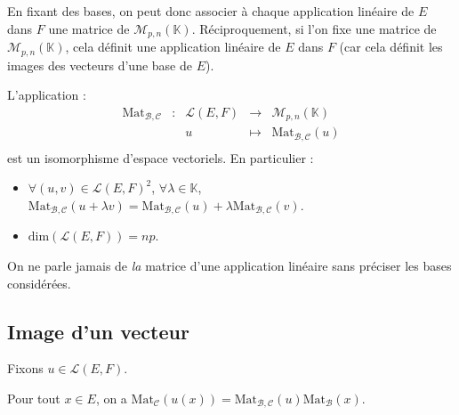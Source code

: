 \documentclass[french,11pt,twoside]{VcCours}
\begin{document}
\medskip

En fixant des bases, on peut donc associer à chaque application linéaire de $E$ dans $F$ une matrice de $\mathcal{M}_{p,n}(\mathbb{K})$. Réciproquement, si l'on fixe une matrice de $\mathcal{M}_{p,n}(\mathbb{K})$, cela définit une application linéaire de $E$ dans $F$ (car cela définit les images des vecteurs d'une base de $E$).

\begin{Theoreme}{} L'application :
$$ \begin{array}{ccccl}
\textrm{Mat}_{\mathcal{B}, \mathcal{C}} & : & \mathcal{L}(E,F) & \rightarrow & \mathcal{M}_{p,n}(\mathbb{K}) \\
& & u & \mapsto & \textrm{Mat}_{\mathcal{B}, \mathcal{C}}(u) \\
\end{array}$$
est un isomorphisme d'espace vectoriels. En particulier :

\begin{itemize}
\item $\forall (u,v) \in \mathcal{L}(E,F)^2$, $\forall \lambda \in \mathbb{K}$, $\textrm{Mat}_{\mathcal{B}, \mathcal{C}}(u + \lambda v) = \textrm{Mat}_{\mathcal{B}, \mathcal{C}}(u) + \lambda \textrm{Mat}_{\mathcal{B}, \mathcal{C}}(v)$.
\item $\textrm{dim}(\mathcal{L}(E,F)) = np$.
\end{itemize}
\end{Theoreme}

\begin{Remarque}{\warning}
 On ne parle jamais de \emph{la} matrice d'une application linéaire sans préciser les bases considérées.
\end{Remarque}

\subsection{Image d'un vecteur}
Fixons $u \in \mathcal{L}(E,F)$.

\begin{Proposition}{} Pour tout $x \in E$, on a $\textrm{Mat}_{\mathcal{C}}(u(x)) = \textrm{Mat}_{\mathcal{B}, \mathcal{C}}(u) \textrm{Mat}_{\mathcal{B}}(x)$.
\end{Proposition}
\end{document}
